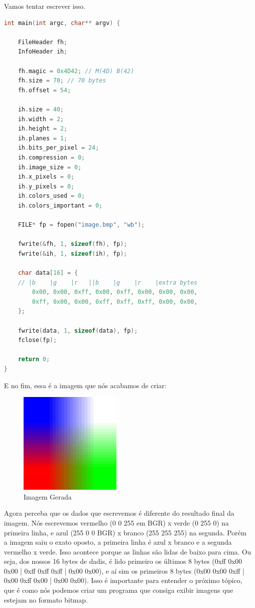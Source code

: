 \documentclass[a4paper,oneside,12pt]{article}
\begin{document}
Vamos tentar escrever isso.
\begin{lstlisting}[language=C, caption=Escrevendo um Bitmap]
int main(int argc, char** argv) {

    FileHeader fh;
    InfoHeader ih;

    fh.magic = 0x4D42; // M(4D) B(42)
    fh.size = 70; // 70 bytes
    fh.offset = 54;

    ih.size = 40;
    ih.width = 2;
    ih.height = 2;
    ih.planes = 1;
    ih.bits_per_pixel = 24;
    ih.compression = 0;
    ih.image_size = 0;
    ih.x_pixels = 0;
    ih.y_pixels = 0;
    ih.colors_used = 0;
    ih.colors_important = 0;

    FILE* fp = fopen("image.bmp", "wb");

    fwrite(&fh, 1, sizeof(fh), fp);
    fwrite(&ih, 1, sizeof(ih), fp);

    char data[16] = {
    // |b    |g    |r   ||b    |g    |r    |extra bytes
        0x00, 0x00, 0xff, 0x00, 0xff, 0x00, 0x00, 0x00,
        0xff, 0x00, 0x00, 0xff, 0xff, 0xff, 0x00, 0x00,
    };

    fwrite(data, 1, sizeof(data), fp);
    fclose(fp);

    return 0;
}
\end{lstlisting}

E no fim, essa é a imagem que nós acabamos de criar:
\begin{figure}[h]
    \centering
    \includegraphics[width=5cm]{media/image.png}
    \caption{Imagem Gerada}
\end{figure}
\break

Agora perceba que os dados que escrevemos é diferente do resultado final da imagem.
Nós escrevemos vermelho (0 0 255 em BGR) x verde (0 255 0) na primeira linha, e azul (255 0 0 BGR) x branco (255 255 255) na segunda. Porém a imagem saiu o exato oposto, a primeira linha é azul x branco e a segunda vermelho x verde. Isso acontece porque as linhas são lidas de baixo para cima.
Ou seja, dos nossos 16 bytes de dadis, é lido primeiro os últimos 8 bytes (0xff 0x00 0x00 | 0xff 0xff 0xff | 0x00 0x00), e aí sim os primeiros 8 bytes (0x00 0x00 0xff | 0x00 0xff 0x00 | 0x00 0x00).
Isso é importante para entender o próximo tópico, que é como nós podemos criar um programa que consiga exibir imagens que estejam no formato bitmap.
\end{document}
